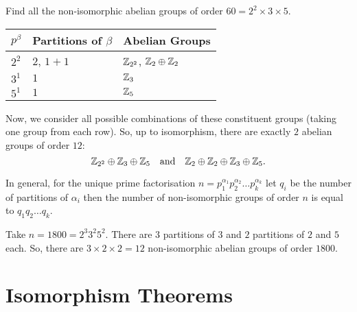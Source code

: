 \documentclass[11pt]{penrose}
\begin{document}
\begin{negg}
    Find all the non-isomorphic abelian groups of order $60 = 2^{2} \times 3 \times 5$.
    \begin{center}
        \begin{tabularx}{0.66\textwidth}{p{8mm}XX}
            \toprule
            $p^{\beta}$ & Partitions of $\beta$ & Abelian Groups\\
            \midrule
            $2^{2}$ & $2$, $1+1$ & $\mathbb{Z}_{2^{2}}$, $\mathbb{Z}_{2} \oplus \mathbb{Z}_{2}$ \\
            $3^{1}$ & $1$        & $\mathbb{Z}_{3}$ \\
            $5^{1}$ & $1$        & $\mathbb{Z}_{5}$ \\
            \bottomrule
        \end{tabularx}
    \end{center}
    Now, we consider all possible combinations of these constituent groups (taking one group from each row). So, up to isomorphism, there are exactly $2$ abelian groups of order $12$:
    \begin{equation*}
        \mathbb{Z}_{2^{2}} \oplus \mathbb{Z}_{3} \oplus \mathbb{Z}_{5}
        \quad\text{and}\quad 
        \mathbb{Z}_{2} \oplus \mathbb{Z}_{2} \oplus \mathbb{Z}_{3} \oplus \mathbb{Z}_{5}.
    \end{equation*}
\end{negg}

In general, for the unique prime factorisation $n = p_{1}^{\alpha_{1}} p_{2}^{\alpha_{2}} \dots p_{k}^{\alpha_{k}}$ let $q_{i}$ be the number of partitions of $\alpha_{i}$ then the number of non-isomorphic groups of order $n$ is equal to $q_{1} q_{2} \dots q_{k}$.

\begin{negg}
    Take $n = 1800 = 2^{3} 3^{2} 5^{2}$. There are $3$ partitions of $3$ and $2$ partitions of $2$ and $5$ each. So, there are $3 \times 2 \times 2 = 12$ non-isomorphic abelian groups of order $1800$.
\end{negg}


\section{Isomorphism Theorems}
\end{document}
